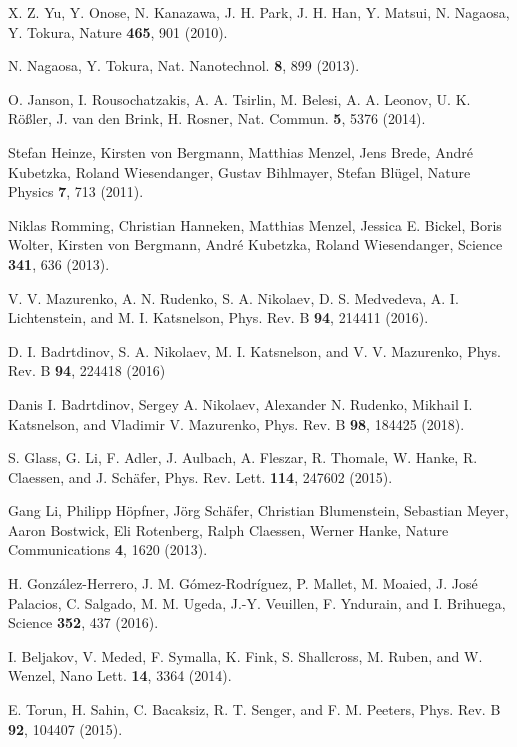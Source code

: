 \documentclass[aps,prl,twocolumn,showpacs,amsmath,amssymb]{revtex4-1}
\begin{document}
\begin{thebibliography}{199}
X. Z. Yu, Y. Onose, N. Kanazawa, J. H. Park, J. H. Han, Y. Matsui, N. Nagaosa, Y. Tokura, Nature {\bf 465}, 901 (2010).

N. Nagaosa, Y. Tokura, Nat. Nanotechnol. {\bf 8}, 899 (2013).

O. Janson, I. Rousochatzakis, A. A. Tsirlin, M. Belesi, A. A. Leonov, U. K. R\"o\ss ler, J. van den Brink, H. Rosner, 
Nat. Commun. {\bf 5}, 5376 (2014).

Stefan Heinze, Kirsten von Bergmann, Matthias Menzel, Jens Brede, Andr\'e Kubetzka, Roland Wiesendanger, Gustav Bihlmayer, Stefan Bl\"ugel, Nature Physics {\bf 7}, 713 (2011).

Niklas Romming, Christian Hanneken, Matthias Menzel, Jessica E. Bickel, Boris Wolter, Kirsten von Bergmann, Andr\'e Kubetzka, Roland Wiesendanger, Science {\bf 341}, 636 (2013).

V. V. Mazurenko, A. N. Rudenko, S. A. Nikolaev, D. S. Medvedeva, A. I. Lichtenstein, and M. I. Katsnelson, Phys. Rev. B {\bf 94}, 214411 (2016).

D. I. Badrtdinov, S. A. Nikolaev, M. I. Katsnelson, and V. V. Mazurenko, Phys. Rev. B {\bf 94}, 224418 (2016)

Danis I. Badrtdinov, Sergey A. Nikolaev, Alexander N. Rudenko, Mikhail I. Katsnelson, and Vladimir V. Mazurenko, Phys. Rev. B {\bf 98}, 184425 (2018).

S. Glass, G. Li, F. Adler, J. Aulbach, A. Fleszar, R. Thomale, W. Hanke, R. Claessen, and J. Sch\"afer, Phys. Rev. Lett. {\bf 114}, 247602 (2015).

Gang Li, Philipp H\"opfner, J\"org Sch\"afer, Christian Blumenstein, Sebastian Meyer, Aaron Bostwick, Eli Rotenberg, Ralph Claessen, Werner Hanke,  Nature Communications {\bf 4}, 1620 (2013).

H. Gonz\'alez-Herrero, J. M. G\'omez-Rodr\'iguez, P. Mallet, M. Moaied, J. Jos\'e Palacios, C. Salgado, M. M. Ugeda, J.-Y. Veuillen, F. Yndurain, and I. Brihuega, Science {\bf 352}, 437 (2016).

I. Beljakov, V. Meded, F. Symalla, K. Fink, S. Shallcross, M. Ruben, and W. Wenzel, Nano Lett. {\bf 14}, 3364 (2014).

E. Torun, H. Sahin, C. Bacaksiz, R. T. Senger, and F. M. Peeters, Phys. Rev. B {\bf 92}, 104407 (2015).


\end{thebibliography}
\end{document}
